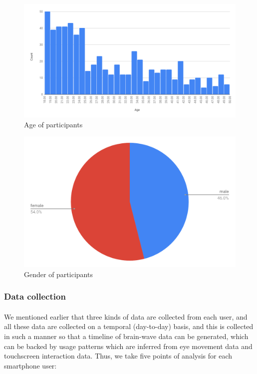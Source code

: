 \documentclass{article}
\begin{document}
\begin{figure}[hbtp]
    \centering
    \includegraphics[width=\textwidth]{p-a.pdf}
    \caption{Age of participants}
    \label{fig:figtwo}
\end{figure}

\begin{figure}[hbtp]
    \centering
    \includegraphics[width=\textwidth]{p-g.pdf}
    \caption{Gender of participants}
    \label{fig:figthree}
\end{figure}

\subsubsection{Data collection}

\paragraph{} We mentioned earlier that three kinds of data are collected from each user, and all these data are collected on a temporal (day-to-day) basis, and this is collected in such a manner so that a timeline of brain-wave data can be generated, which can be backed by usage patterns which are inferred from eye movement data and touchscreen interaction data. Thus, we take five points of analysis for each smartphone user:
\end{document}
